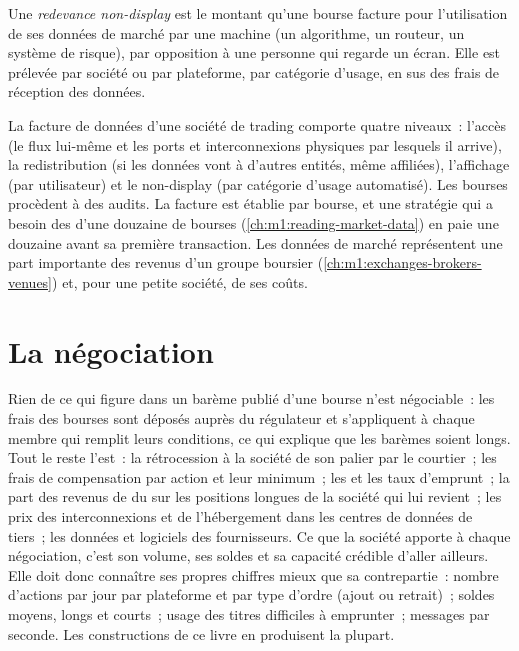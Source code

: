 \begin{definition}\label{def:m1:getting-access-equities:nondisplay}
Une \emph{redevance non-display} est le montant qu'une bourse
facture pour l'utilisation de ses données de marché par une machine (un algorithme, un routeur, un
système de risque), par opposition à une personne qui regarde un écran. Elle est prélevée
par société ou par plateforme, par catégorie d'usage, en sus des frais de réception des
données.
\end{definition}

La facture de données d'une société de trading comporte quatre niveaux~: l'accès
(le flux lui-même et les ports et interconnexions physiques par lesquels il arrive), la
redistribution (si les données vont à d'autres entités, même affiliées), l'affichage (par utilisateur) et le
non-display (par catégorie d'usage automatisé). Les bourses procèdent à des audits. La facture est établie par
bourse, et une stratégie qui a besoin des  d'une douzaine de bourses
(\cref{ch:m1:reading-market-data}) en paie une douzaine avant sa première transaction. Les données de marché représentent
une part importante des revenus d'un groupe boursier
(\cref{ch:m1:exchanges-brokers-venues}) et, pour une petite société, de ses coûts.

\section{La négociation}

Rien de ce qui figure dans un barème publié d'une bourse n'est négociable~: les frais des bourses sont déposés auprès du
régulateur et s'appliquent à chaque membre qui remplit leurs conditions,
ce qui explique que les barèmes soient longs. Tout le reste l'est~: la rétrocession à la société de son palier par le courtier~; les frais de
compensation par action et leur minimum~; les  et les taux d'emprunt~;
la part des revenus de  du  sur les positions longues de la société
qui lui revient~; les prix des interconnexions et de l'hébergement dans les
centres de données de tiers~; les données et logiciels des fournisseurs. Ce que la société apporte à chaque
négociation, c'est son volume, ses soldes et sa capacité crédible d'aller ailleurs. Elle
doit donc connaître ses propres chiffres mieux que sa contrepartie~: nombre d'actions par jour par plateforme
et par type d'ordre (ajout ou retrait)~; soldes moyens, longs et
courts~; usage des titres difficiles à emprunter~; messages par seconde. Les constructions de ce livre
en produisent la plupart.

